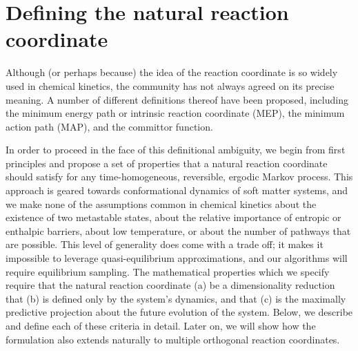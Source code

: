 \documentclass[aip, jcp, reprint, nolinenumbers, twocolumn, nobalancelastpage]{revtex4-1} %
\begin{document}

\section{Defining the natural reaction coordinate}

Although (or perhaps because) the idea of the reaction coordinate is so widely used in chemical kinetics, the community has not always agreed on its precise meaning. A number of different definitions thereof have been proposed, including the minimum energy path or intrinsic reaction coordinate (MEP),\cite{fukui1970formulation, tachibana1980novel, quapp1984analysis, yamashita1981irc} the minimum action path (MAP),\cite{olender1997yet, heymann2008geometric, eastman2001simulation, ren2004minimum, lipfert2005protein} and the committor function.\cite{Bolhuis2002TRANSITION, dellago2002transition}

In order to proceed in the face of this definitional ambiguity, we begin from first principles and propose a set of properties that a natural reaction coordinate should satisfy for any time-homogeneous, reversible, ergodic Markov process. This approach is geared towards conformational dynamics of soft matter systems, and we make none of the assumptions common in chemical kinetics about the existence of two metastable states, about the relative importance of entropic or enthalpic barriers, about low temperature, or about the number of pathways that are possible. This level of generality does come with a trade off; it makes it impossible to leverage quasi-equilibrium approximations, and our algorithms will require equilibrium sampling. The mathematical properties which we specify require that the natural reaction coordinate (a) be a dimensionality reduction that (b) is defined only by the system's dynamics, and that (c) is the maximally predictive projection about the future evolution of the system. Below, we describe and define each of these criteria in detail.
Later on, we will show how the formulation also extends naturally to multiple orthogonal reaction coordinates.
\end{document}
